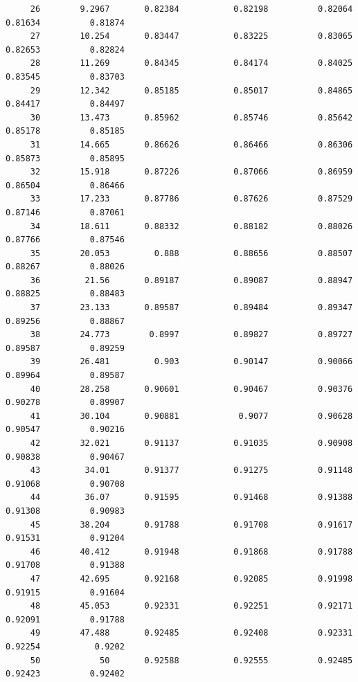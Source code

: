 \documentclass[
]{book}
\begin{document}
\begin{verbatim}
     26        9.2967       0.82384           0.82198          0.82064          0.81634          0.81874   
     27        10.254       0.83447           0.83225          0.83065          0.82653          0.82824   
     28        11.269       0.84345           0.84174          0.84025          0.83545          0.83703   
     29        12.342       0.85185           0.85017          0.84865          0.84417          0.84497   
     30        13.473       0.85962           0.85746          0.85642          0.85178          0.85185   
     31        14.665       0.86626           0.86466          0.86306          0.85873          0.85895   
     32        15.918       0.87226           0.87066          0.86959          0.86504          0.86466   
     33        17.233       0.87786           0.87626          0.87529          0.87146          0.87061   
     34        18.611       0.88332           0.88182          0.88026          0.87766          0.87546   
     35        20.053         0.888           0.88656          0.88507          0.88267          0.88026   
     36         21.56       0.89187           0.89087          0.88947          0.88825          0.88483   
     37        23.133       0.89587           0.89484          0.89347          0.89256          0.88867   
     38        24.773        0.8997           0.89827          0.89727          0.89587          0.89259   
     39        26.481         0.903           0.90147          0.90066          0.89964          0.89587   
     40        28.258       0.90601           0.90467          0.90376          0.90278          0.89907   
     41        30.104       0.90881            0.9077          0.90628          0.90547          0.90216   
     42        32.021       0.91137           0.91035          0.90908          0.90838          0.90467   
     43         34.01       0.91377           0.91275          0.91148          0.91068          0.90708   
     44         36.07       0.91595           0.91468          0.91388          0.91308          0.90983   
     45        38.204       0.91788           0.91708          0.91617          0.91531          0.91204   
     46        40.412       0.91948           0.91868          0.91788          0.91708          0.91388   
     47        42.695       0.92168           0.92085          0.91998          0.91915          0.91604   
     48        45.053       0.92331           0.92251          0.92171          0.92091          0.91788   
     49        47.488       0.92485           0.92408          0.92331          0.92254           0.9202   
     50            50       0.92588           0.92555          0.92485          0.92423          0.92402   
\end{verbatim}
\end{document}
